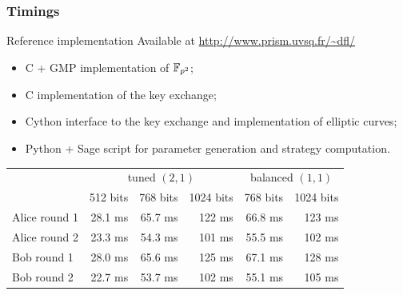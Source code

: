 \documentclass{beamer}
\begin{document}
\begin{frame}
  \frametitle{Timings}
  
  \begin{block}{Reference implementation}
    Available at \alert{\url{http://www.prism.uvsq.fr/~dfl/}}
    \begin{itemize}
    \item C + GMP implementation of $\mathbb{F}_{p^2}$;
    \item C implementation of the key exchange;
    \item Cython interface to the key exchange and implementation of
      elliptic curves;
    \item Python + Sage script for parameter generation and strategy computation.
    \end{itemize}
  \end{block}

  \begin{center}
    \begin{tabular}{l | r r r | r r }
      \hline
      & \multicolumn{3}{c|}{tuned $(2,1)$} & \multicolumn{2}{c}{balanced $(1,1)$} \\
      & 512 bits & 768 bits & 1024 bits & 768 bits & 1024 bits \\
      \hline
      Alice round 1 & 28.1 ms & 65.7 ms & 122 ms & 66.8 ms & 123 ms \\
      Alice round 2 & 23.3 ms & 54.3 ms & 101 ms & 55.5 ms & 102 ms \\
      Bob round 1   & 28.0 ms & 65.6 ms & 125 ms & 67.1 ms & 128 ms \\
      Bob round 2   & 22.7 ms & 53.7 ms & 102 ms & 55.1 ms & 105 ms \\
      \hline
    \end{tabular}
  \end{center}
\end{frame}

\end{document}
